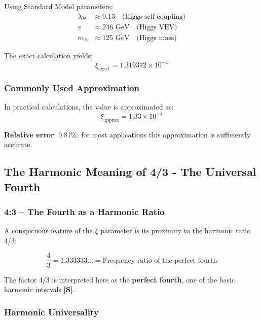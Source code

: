 	Using Standard Model parameters:
	\begin{align}
		\lambda_H &\approx 0.13 \quad \text{(Higgs self-coupling)} \\
		v &\approx 246 \text{ GeV} \quad \text{(Higgs VEV)} \\
		m_h &\approx 125 \text{ GeV} \quad \text{(Higgs mass)}
	\end{align}
	
	The exact calculation yields:
	\begin{equation}
		\xi_{\text{exact}} = 1.319372 \times 10^{-4}
		\label{eq:xi_exact}
	\end{equation}
	
	\subsubsection{Commonly Used Approximation}
	\label{subsubsec:approximation}
	
	In practical calculations, the value is approximated as:
	\begin{equation}
		\xi_{\text{approx}} = 1.33 \times 10^{-4}
		\label{eq:xi_approx}
	\end{equation}
	
	\textbf{Relative error}: 0.81\%; for most applications this approximation is sufficiently accurate.
	
	\subsection{The Harmonic Meaning of 4/3 - The Universal Fourth}
	\label{subsec:four_thirds_proximity}
	
	\subsubsection{4:3 -- The Fourth as a Harmonic Ratio}
	\label{subsubsec:four_thirds_connection}
	
	A conspicuous feature of the $\xi$ parameter is its proximity to the harmonic ratio 4/3:
	
	\begin{equation}
		\frac{4}{3} = 1.333333\ldots = \text{Frequency ratio of the perfect fourth}
		\label{eq:four_thirds}
	\end{equation}
	
	The factor 4/3 is interpreted here as the \textbf{perfect fourth}, one of the basic harmonic intervals \textbf{[S]}.
	
	\subsubsection{Harmonic Universality}
	\label{subsubsec:harmonic_universality}
	
